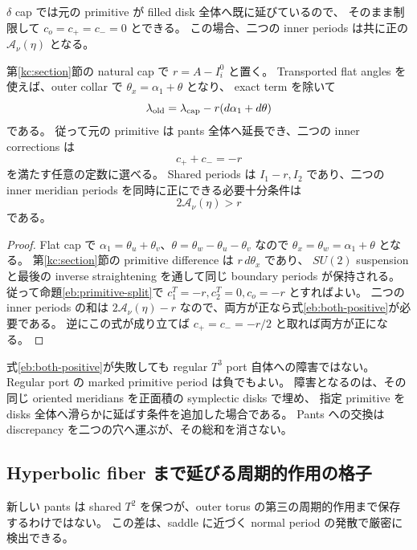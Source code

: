 $\delta$ cap では元の primitive が filled disk 全体へ既に延びているので、
そのまま制限して $c_o=c_+=c_-=0$ とできる。
この場合、二つの inner periods は共に正の $\mathcal A_\nu(\eta)$ となる。

\begin{corollary}\label{eb:natural-periods}
第\ref{kc:section}節の natural cap で $r=A-I_i^0$ と置く。
Transported flat angles を使えば、outer collar で $\theta_x=\alpha_1+\theta$ となり、
exact term を除いて
\[
 \lambda_{\rm old}=\lambda_{\rm cap}-r(d\alpha_1+d\theta)
\]
である。
従って元の primitive は pants 全体へ延長でき、二つの inner corrections は
\[
 c_++c_-=-r
\]
を満たす任意の定数に選べる。
Shared periods は $I_1-r,I_2$ であり、二つの inner meridian periods を同時に正にできる必要十分条件は
\begin{equation}\label{eb:both-positive}
 2\mathcal A_\nu(\eta)>r
\end{equation}
である。
\end{corollary}

\begin{proof}
Flat cap で $\alpha_1=\theta_u+\theta_v$、$\theta=\theta_w-\theta_u-\theta_v$ なので
$\theta_x=\theta_w=\alpha_1+\theta$ となる。
第\ref{kc:section}節の primitive difference は $r\,d\theta_x$ であり、
$SU(2)$ suspension と最後の inverse straightening を通して同じ boundary periods が保持される。
従って命題\ref{eb:primitive-split}で $c_1^T=-r,c_2^T=0,c_o=-r$ とすればよい。
二つの inner periods の和は $2\mathcal A_\nu(\eta)-r$ なので、両方が正なら式\eqref{eb:both-positive}が必要である。
逆にこの式が成り立てば $c_+=c_-=-r/2$ と取れば両方が正になる。
\end{proof}

式\eqref{eb:both-positive}が失敗しても regular $T^3$ port 自体への障害ではない。
Regular port の marked primitive period は負でもよい。
障害となるのは、その同じ oriented meridians を正面積の symplectic disks で埋め、
指定 primitive を disks 全体へ滑らかに延ばす条件を追加した場合である。
Pants への交換は discrepancy を二つの穴へ運ぶが、その総和を消さない。

\subsection{Hyperbolic fiber まで延びる周期的作用の格子}

新しい pants は shared $T^2$ を保つが、outer torus の第三の周期的作用まで保存するわけではない。
この差は、saddle に近づく normal period の発散で厳密に検出できる。

